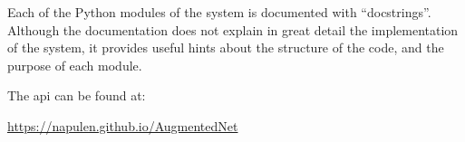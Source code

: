 
Each of the Python modules of the system is documented with
``docstrings''.
Although the documentation does not explain in great detail
the implementation of the system, it provides useful hints
about the structure of the code, and the purpose of each
module.

The \gls{api} can be found at:

\href{https://napulen.github.io/AugmentedNet}{https://napulen.github.io/AugmentedNet}
